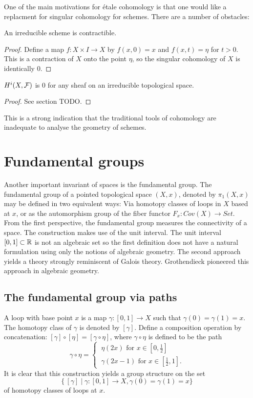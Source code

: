 One of the main motivations for \'etale cohomology is that one would like a replacment for singular cohomology for schemes. There are a number of obstacles:
\begin{proposition}\label{scheme_contractible}
	An irreducible scheme is contractible.
\end{proposition}
\begin{proof}
	Define a map $f: X \times I \to X$  by $f(x,0) = x$ and $f(x,t) = \eta$ for $t > 0$. This is a contraction of $X$ onto the point $\eta$, so the singular cohomology of $X$ is identically 0.
\end{proof}

\begin{proposition}
	$H^i(X, \mathcal{F})$ is 0 for any sheaf on an irreducible topological space.
\end{proposition}
\begin{proof}
	See section TODO.
\end{proof}
This is a strong indication that the traditional tools of cohomology are inadequate to analyse the geometry of schemes.


\section{Fundamental groups}
Another important invariant of spaces is the fundamental group. The fundamental group of a pointed topological space $(X,x)$, denoted by $\pi_1(X,x)$ may be defined in two equivalent ways: Via homotopy classes of loops in $X$ based at $x$, or as the automorphism group of the fiber functor $F_x: Cov(X) \to Set$. From the first perspective, the fundamental group measures the connectivity of a space. The construction makes use of the unit interval. The unit interval $[0,1] \subset \mathbb{R}$ is not an algebraic set so the first definition does not have a natural formulation using only the notions of algebraic geometry. The second approach yields a theory strongly reminiscent of Galois theory. Grothendieck pioneered this approach in algebraic geometry.

\subsection{The fundamental group via paths}
A loop with base point $x$ is a map $\gamma : [0,1] \to X$ such that $\gamma(0) = \gamma(1) = x$. The homotopy class of $\gamma $ is denoted by $[\gamma]$. Define a composition operation by concatenation: $[\gamma] \circ [\eta] = [\gamma \circ \eta]$, where $\gamma \circ \eta$ is defined to be the path
\[
	\gamma \circ \eta =
	\begin{cases}
		\ \eta(2x) \text{ for } x \in [0, \tfrac{1}{2}] \\
		\ \gamma(2x - 1) \text{ for } x \in [\tfrac{1}{2}, 1].
	\end{cases}
\]
It is clear that this construction yields a group structure on the set
\[
	\{\ [\gamma] \mid \gamma : [0,1] \to X , \gamma(0) = \gamma(1) = x \}
\]
of homotopy classes of loops at $x$.

